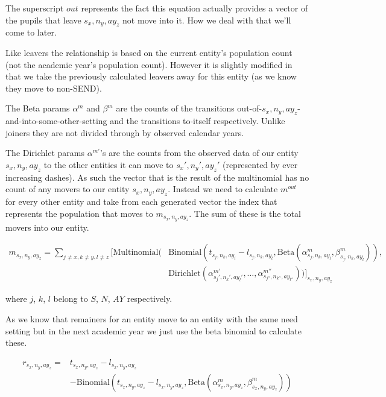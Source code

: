 \documentclass[margin=5mm]{article}
\begin{document}
The superscript $out$ represents the fact this equation actually
provides a vector of the pupils that leave ${s_x,n_y,ay_z}$ not move
into it.  How we deal with that we'll come to later.

Like leavers the relationship is based on the current entity's
population count (not the academic year's population count).  However
it is slightly modified in that we take the previously calculated
leavers away for this entity (as we know they move to non-SEND).

The Beta params $\alpha^m$ and $\beta^m$ are the counts of the
transitions out-of-${s_x,n_y,ay_z}$-and-into-some-other-setting and the
transitions to-itself respectively.  Unlike joiners they are not
divided through by observed calendar years.

The Dirichlet params $\alpha^{m'}$'s are the counts from the observed
data of our entity ${s_x,n_y,ay_z}$ to the other entities it can move
to ${s_x',n_y',ay_z'}$ (represented by ever increasing dashes).  As
such the vector that is the result of the multinomial has no count of
any movers to our entity ${s_x,n_y,ay_z}$.  Instead we need to
calculate $m^{out}$ for every other entity and take from each
generated vector the index that represents the population that moves
to $m_{s_x,n_y,ay_z}$.  The sum of these is the total movers into our
entity.

\begin{equation*}
  \begin{split}
    m_{s_x,n_y,ay_z} = \sum_{j \neq x, k \neq y , l \neq z }\bigg[
        \text{Multinomial}( & \text{Binomial}(t_{s_j,n_k,ay_l} - l_{s_j,n_k,ay_l}, 
        \text{Beta}(\alpha^m_{s_j,n_k,ay_l},\beta^m_{s_j,n_k,ay_l})),
        \\ &  \text{Dirichlet}(\alpha^{m'}_{s_j',n_k',ay_l'}, \dots,
        \alpha^{m''}_{s_{j''},n_{k''},ay_{l''}}))\bigg]_{s_x,n_y,ay_z}
\end{split}
\end{equation*}

where $j$, $k$, $l$ belong to $S$, $N$, $AY$ respectively.

As we know that remainers for an entity move to an entity with the
same need setting but in the next academic year we just use the beta
binomial to calculate these.

\begin{equation*}
  \begin{split}
    r_{s_x,n_y,ay_z} = & t_{s_x,n_y,ay_z}
    - l_{s_x,n_y,ay_z} \\ & - \text{Binomial}(t_{s_x,n_y,ay_z} - l_{s_x,n_y,ay_z}, 
\text{Beta}(\alpha^m_{s_x,n_y,ay_z},\beta^m_{s_x,n_y,ay_z}))
\end{split}
\end{equation*}
\end{document}
